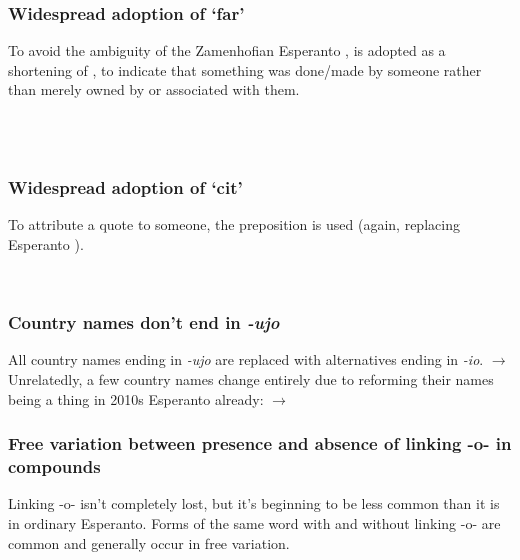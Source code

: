 \subsubsection{Widespread adoption of `far'}

To avoid the ambiguity of the Zamenhofian Esperanto ,  is adopted as a shortening of , to indicate that something was done/made by someone rather than merely owned by or associated with them.

\pex
\a
{}\\
\a
{}\\
\xe

\subsubsection{Widespread adoption of `cit'}

To attribute a quote to someone, the preposition  is used (again, replacing Esperanto ).

\ex
{}\\
\xe

\subsubsection{Country names don't end in \textit{-ujo}}

All country names ending in \textit{-ujo} are replaced with alternatives ending in \textit{-io}. 
\ex
{} $\to$ \\
\xe
Unrelatedly, a few country names change entirely due to reforming their names being a thing in 2010s Esperanto already:
\ex
{} $\to$ \\
\xe

\subsubsection{Free variation between presence and absence of linking -o- in compounds}

Linking -o- isn't completely lost, but it's beginning to be less common than it is in ordinary Esperanto. Forms of the same word with and without linking -o- are common and generally occur in free variation.

